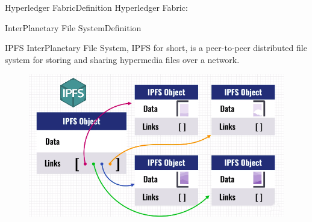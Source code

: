 \begin{frame}{Hyperledger Fabric}{Definition}
    Hyperledger Fabric:
    \begin{itemize}
    \end{itemize}
\end{frame}

\begin{frame}{InterPlanetary File System}{Definition}
    \begin{block}{IPFS}
        InterPlanetary File System, IPFS for short, is a peer-to-peer distributed file system for storing and sharing hypermedia files over a network.
    \end{block}
    \pause
    \begin{figure}
        \centering
        \includegraphics[width=.7\textwidth,height=.35\textwidth]{img/IPFS.png}
    \end{figure}
\end{frame}
